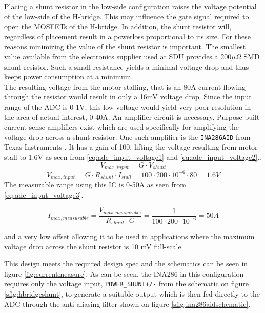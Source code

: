 Placing a shunt resistor in the low-side configuration raises the voltage potential of the low-side of the H-bridge.
This may influence the gate signal required to open the MOSFETs of the H-bridge.
In addition, the shunt resistor will, regardless of placement result in a powerloss proportional to its size.
For these reasons minimizing the value of the shunt resistor is important. 
The smallest value available from the electronics supplier used at SDU provides a 200$\mu\Omega$ SMD shunt resistor.
Such a small resistance yields a minimal voltage drop and thus keeps power consumption at a minimum.\\
The resulting voltage from the motor stalling, that is an 80A current flowing through the resistor would result in only a 16mV voltage drop.
Since the input range of the ADC is 0-1V, this low voltage would yield very poor resolution in the area of actual interest, 0-40A.
An amplifier circuit is necessary.
Purpose built current-sense amplifiers exist which are used specifically for amplifying the voltage drop across a shunt resistor.
One such amplifier is the \texttt{INA286AID} from Texas Instruments \cite{INA286AID}.
It has a gain of 100, lifting the voltage resulting from motor stall to 1.6V as seen from \ref{eq:adc_input_voltage1} and \ref{eq:adc_input_voltage2}..
\begin{equation}
	V_{max,input} = G \cdot V_{shunt}
	\label{eq:adc_input_voltage1}
\end{equation}
\begin{equation}
	V_{max,input} = G \cdot R_{shunt} \cdot I_{stall} = 100 \cdot 200\cdot10^{-6} \cdot 80 = 1.6V
	\label{eq:adc_input_voltage2}
\end{equation}
The measurable range using this IC is 0-50A as seen from \ref{eq:adc_input_voltage3}.

\begin{equation}
	I_{max, measurable} = \frac{V_{max, measurable}}{R_{shunt}\cdot G} = \frac{1}{100 \cdot 200\cdot10^{-6} } = 50A
	\label{eq:adc_input_voltage3}
\end{equation}

and a very low offset allowing it to be used in applications where the maximum voltage drop across the shunt resistor is 10 mV full-scale 

This design meets the required design spec and the schematics can be seen in figure \ref{fig:currentmeasure}.
As can be seen, the INA286 in this configuration requires only the voltage input, \texttt{POWER\_SHUNT+/-} from the schematic on figure \ref{sfig:hbridgeshunt}, to generate a suitable output which is then fed directly to the ADC through the anti-aliasing filter shown on figure \ref{sfig:ina286aidschematic}.

